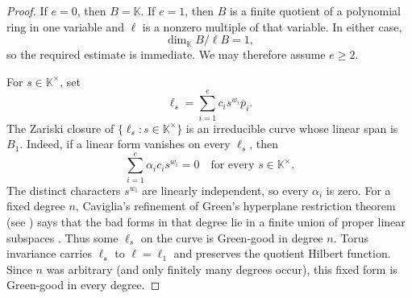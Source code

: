 \documentclass[11pt,reqno]{amsart}
\newcommand\K{\ensuremath{\mathbb{K}}}
\theoremstyle{definition}
\theoremstyle{plain}
\numberwithin{equation}{section}
\begin{document}
\begin{proof}
If $e=0$, then $B=\K$. If $e=1$, then $B$ is a finite quotient of a
polynomial ring in one variable and $\ell$ is a nonzero multiple of
that variable. In either case,
\begin{equation*}
    \dim_{\K}B/\ell B=1,
\end{equation*}
so the required estimate is immediate. We may therefore assume
$e\geq2$.

For $s\in\K^\times$, set
\begin{equation*}
    \ell_s=\sum_{i=1}^e c_i s^{w_i}\overline p_i.
\end{equation*}
The Zariski closure of
$\{\ell_s:s\in\K^\times\}$ is an irreducible curve whose linear span is
$B_1$. Indeed, if a linear form vanishes on every $\ell_s$, then
\begin{equation*}
    \sum_{i=1}^e\alpha_i c_i s^{w_i}=0
    \quad\text{for every }s\in\K^\times.
\end{equation*}
The distinct characters $s^{w_i}$ are linearly independent, so every
$\alpha_i$ is zero. For a fixed degree $n$, Caviglia's
refinement of Green's hyperplane restriction theorem (see \cite{Green1989}) says that the bad
forms in that degree lie in a finite union of proper linear subspaces
\cite[Theorems 1.15]{Caviglia2022}.  Thus some $\ell_s$ on the curve is
Green-good in degree $n$.  Torus invariance carries $\ell_s$ to
$\ell=\ell_1$ and preserves the quotient Hilbert function.  Since $n$ was
arbitrary (and only finitely many degrees occur), this fixed form is
Green-good in every degree.


\end{proof}
\end{document}
